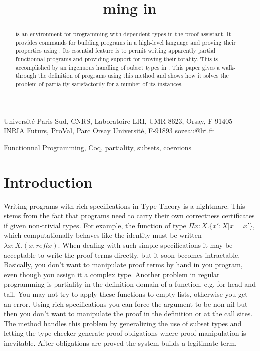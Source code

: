 \documentclass[preprint,10pt]{sigplanconf}
\begin{document}


\title{\Program{}ming in \Coq}

{Universit\'e Paris Sud, CNRS, Laboratoire LRI, UMR 8623, Orsay, F-91405\\
INRIA Futurs, ProVal, Parc Orsay Universit\'e, F-91893}
{sozeau@lri.fr}

\maketitle

\begin{abstract}
  \Program is an environment for programming with dependent types in the
  \Coq proof assistant. It provides commands for building programs in a
  high-level language \Russell and proving their properties using \Coq.
  Its essential feature is to permit writing
  apparently partial functionnal programs and providing support for proving their
  totality. This is accomplished by an ingenuous handling of subset
  types in \Russell. 
  This paper gives a walk-through the definition of programs using this
  method and shows how it solves the problem of partiality
  satisfactorily for a number of its instances.
\end{abstract}



\keywords
Functionnal Programming, Coq, partiality, subsets, coercions

\section{Introduction}
Writing programs with rich specifications in Type Theory is a nightmare.
This stems from the fact that programs need to carry their own
correctness certificates if given non-trivial types. For example, the
function of type $\Pi x : X.\{ x' : X | x = x'\}$, which
computationally behaves like the identity must be written $\lambda x :
X. (x, refl x)$. When dealing with such simple specifications it may be
acceptable to write the proof terms directly, but it soon becomes
intractable. Basically, you don't want to manipulate proof terms by hand
in you program, even though you assign it a complex type. Another
problem in regular programming is partiality in the definition domain of
a function, e.g. for head and tail. You may not try to apply these
functions to empty lists, otherwise you get an error. Using rich
specifications you can force the argument to be non-nil but then you
don't want to manipulate the proof in the definition or at the call
sites. The \Program method handles this problem by generalizing the use of
subset types and letting the \Russell type-checker generate proof
obligations where proof manipulation is inevitable. After obligations
are proved the system builds a legitimate \Coq term.
\end{document}
